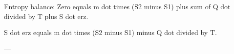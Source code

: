 Entropy balance:  
Zero equals m dot times (S2 minus S1) plus sum of Q dot divided by T plus S dot erz.  

S dot erz equals m dot times (S2 minus S1) minus Q dot divided by T.  

---